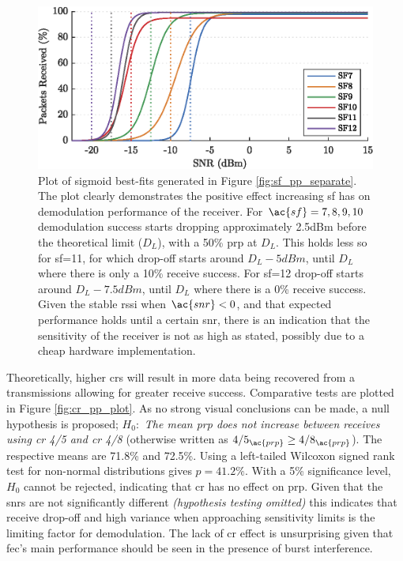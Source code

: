 \begin{figure}[H]
    \centering
   	\includegraphics{Figures/sf_fit_plot}
    \caption[Sigmoid best-fits for \ac{snr} vs \ac{prp}]{
    Plot of sigmoid best-fits generated in Figure \ref{fig:sf_pp_separate}. The plot clearly demonstrates the positive effect increasing \ac{sf} has on demodulation performance of the receiver. For $\ac{sf}=7,8,9,10$ demodulation success starts dropping approximately 2.5dBm before the theoretical limit ($D_L$), with a 50\% \ac{prp} at $D_L$. This holds less so for \ac{sf}=11, for which drop-off starts around $D_L - 5dBm$, until $D_L$ where there is only a 10\% receive success. For \ac{sf}=12 drop-off starts around $D_L - 7.5dBm$, until $D_L$ where there is a 0\% receive success. Given the stable \ac{rssi} when $\ac{snr} < 0$, and that expected performance holds until a certain \ac{snr}, there is an indication that the sensitivity of the receiver is not as high as stated, possibly due to a cheap hardware implementation.
     }
    \label{fig:sf_pp_fit}
\end{figure}

Theoretically, higher \ac{cr}s will result in more data being recovered from a transmissions allowing for greater receive success. Comparative tests are plotted in Figure \ref{fig:cr_pp_plot}. As no strong visual conclusions can be made, a null hypothesis is proposed; $H_{0} : $ \textit{The mean \ac{prp} does not increase between receives using \ac{cr} 4/5 and \ac{cr} 4/8} (otherwise written as $4/5_{\ac{prp}} \geq 4/8_{\ac{prp}}$). The respective means are 71.8\% and 72.5\%. Using a left-tailed Wilcoxon signed rank test for non-normal distributions gives $p=41.2\%$. With a 5\% significance level,  $H_{0}$ cannot be rejected, indicating that \ac{cr} has no effect on \ac{prp}.  Given that the \ac{snr}s are not significantly different \textit{(hypothesis testing omitted)} this indicates that receive drop-off and high variance when approaching sensitivity limits is the limiting factor for demodulation. The lack of \ac{cr} effect is unsurprising given that \ac{fec}'s main performance should be seen in the presence of burst interference.


